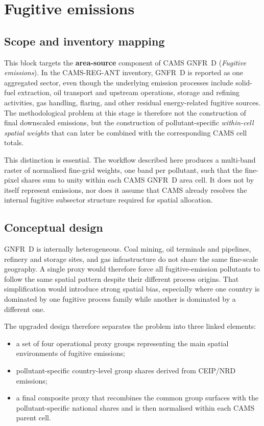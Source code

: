 \section{Fugitive emissions}
\label{sec:fugitive}

\subsection{Scope and inventory mapping}

This block targets the \textbf{area-source} component of CAMS GNFR~D
(\emph{Fugitive emissions}). In the CAMS-REG-ANT inventory, GNFR~D is
reported as one aggregated sector, even though the underlying emission
processes include solid-fuel extraction, oil transport and upstream
operations, storage and refining activities, gas handling, flaring, and
other residual energy-related fugitive sources. The methodological
problem at this stage is therefore not the construction of final
downscaled emissions, but the construction of pollutant-specific
\emph{within-cell spatial weights} that can later be combined with the
corresponding CAMS cell totals.

This distinction is essential. The workflow described here produces a
multi-band raster of normalised fine-grid weights, one band per
pollutant, such that the fine-pixel shares sum to unity within each
CAMS GNFR~D area cell. It does not by itself represent emissions, nor
does it assume that CAMS already resolves the internal fugitive
subsector structure required for spatial allocation.

\subsection{Conceptual design}

GNFR~D is internally heterogeneous. Coal mining, oil terminals and
pipelines, refinery and storage sites, and gas infrastructure do not
share the same fine-scale geography. A single proxy would therefore
force all fugitive-emission pollutants to follow the same spatial
pattern despite their different process origins. That simplification
would introduce strong spatial bias, especially where one country is
dominated by one fugitive process family while another is dominated by a
different one.

The upgraded design therefore separates the problem into three linked
elements:
\begin{itemize}
  \item a set of four operational proxy groups representing the main
        spatial environments of fugitive emissions;
  \item pollutant-specific country-level group shares derived from
        CEIP/NRD emissions;
  \item a final composite proxy that recombines the common group
        surfaces with the pollutant-specific national shares and is then
        normalised within each CAMS parent cell.
\end{itemize}

